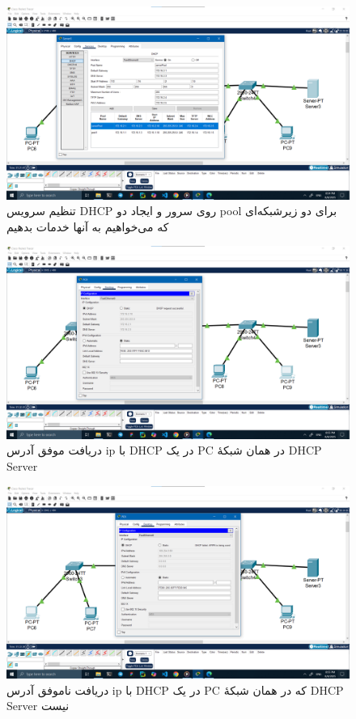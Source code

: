 \documentclass[12pt]{article}
\begin{document}
	\begin{figure}[H]
		\centering
		\includegraphics[width=\textwidth]{resources/scenario2-10.png}
		\caption{تنظیم سرویس \textenglish{DHCP} روی سرور و ایجاد دو \textenglish{pool} برای دو زیرشبکه‌ای که می‌خواهیم به آنها خدمات بدهیم}
		\label{2:10}
	\end{figure}
	\begin{figure}[H]
		\centering
		\includegraphics[width=\textwidth]{resources/scenario2-11.png}
		\caption{دریافت موفق آدرس \textenglish{ip} با \textenglish{DHCP} در یک \textenglish{PC} در همان شبکهٔ \textenglish{DHCP Server}}
		\label{2:11}
	\end{figure}
	\begin{figure}[H]
		\centering
		\includegraphics[width=\textwidth]{resources/scenario2-12.png}
		\caption{دریافت ناموفق آدرس \textenglish{ip} با \textenglish{DHCP} در یک \textenglish{PC} که در همان شبکهٔ \textenglish{DHCP Server} نیست}
		\label{2:12}
	\end{figure}
\end{document}
